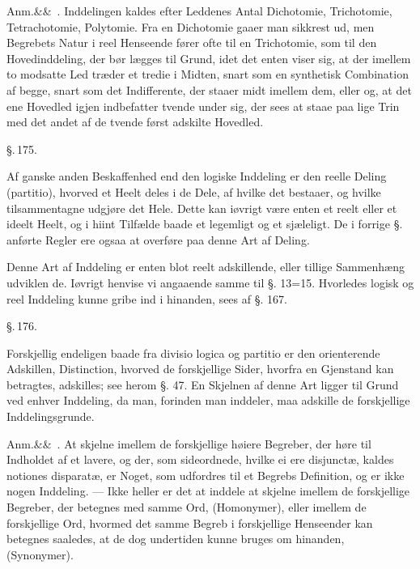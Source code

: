 \documentclass[12pt]{book}
\def\sperr#1{#1}%
\def\textit#1{#1}%
\def\emph#1{#1}%
\newcommand{\sperr}[1]{\textls[180]{#1}}
\newcommand{\parag}[1]{%
  \par\vspace{0.9\baselineskip}%
  {\centering\textit{\S.\,#1.}\par}%
  \vspace{0.35\baselineskip}%
  \noindent\hspace{\parindent}\ignorespaces
}
\newcommand{\anm}[1]{%
  \par\vspace{0.5\baselineskip}%
  \noindent\hspace{\parindent}\sperr{Anm.}\ifx&#1&\else~\textit{#1}.\fi
  \enspace\ignorespaces
}
\newcommand{\opage}[1]{\marginnote{\footnotesize\textit{[#1]}}}
\begin{document}
\anm{} Inddelingen kaldes efter Leddenes Antal Dichotomie, Trichotomie,
Tetrachotomie, Polytomie. Fra en Dichotomie gaaer man sikkrest ud, men
Begrebets Natur i reel Henseende fører ofte til en Trichotomie, som til den
Hovedinddeling, der bør lægges til Grund, idet det enten viser sig, at der
imellem to modsatte Led træder et tredie i Midten, snart som en synthetisk
Combination af begge, snart som det Indifferente, der staaer midt imellem
dem, eller og, at det ene Hovedled igjen indbefatter tvende under sig, der
sees at staae paa lige Trin med det andet af de tvende først adskilte
Hovedled.

\parag{175}

Af ganske anden Beskaffenhed end den logiske Inddeling er den
\emph{reelle Deling} (\textit{partitio}), hvorved et Heelt deles i de Dele,
af hvilke det bestaaer, og hvilke tilsammentagne udgjøre det Hele. Dette kan
iøvrigt være enten et reelt eller et ideelt Heelt, og i hiint Tilfælde baade
et legemligt og et sjæleligt. De i forrige §. anførte Regler ere ogsaa at
overføre paa denne Art af Deling.

Denne Art af Inddeling er enten blot \emph{reelt adskillende}, eller tillige
\emph{Sammenhæng udviklen%
\opage{378}de}. Iøvrigt henvise vi angaaende samme til §. 13=15. Hvorledes logisk og
reel Inddeling kunne gribe ind i hinanden, sees af §. 167.

\parag{176}

Forskjellig endeligen baade fra \textit{divisio logica} og \textit{partitio}
er den \emph{orienterende Adskillen}, \emph{Distinction}, hvorved de
forskjellige Sider, hvorfra en Gjenstand kan betragtes, adskilles; see
herom §. 47. En Skjelnen af denne Art ligger til Grund ved enhver
Inddeling, da man, forinden man inddeler, maa adskille de forskjellige
Inddelingsgrunde.

\anm{} At skjelne imellem de forskjellige høiere Begreber, der høre til
Indholdet af et lavere, og der, som sideordnede, hvilke ei ere
\textit{disjunctæ}, kaldes \textit{notiones disparatæ}, er Noget, som
udfordres til et Begrebs Definition, og er ikke nogen Inddeling. --- Ikke
heller er det at inddele at skjelne imellem de forskjellige Begreber, der
betegnes med samme Ord, (Homonymer), eller imellem de forskjellige Ord,
hvormed det samme Begreb i forskjellige Henseender kan betegnes saaledes, at
de dog undertiden kunne bruges om hinanden, (Synonymer).
\end{document}
